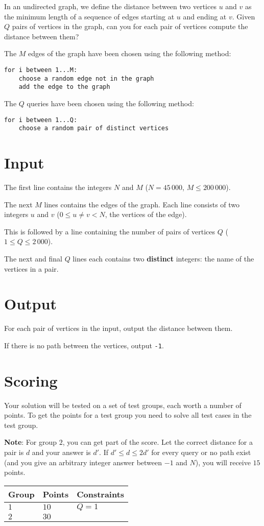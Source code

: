 In an undirected graph, we define the distance between two vertices $u$ and $v$ as the minimum length of a sequence of edges starting at $u$ and ending at $v$.
Given $Q$ pairs of vertices in the graph, can you for each pair of vertices compute the distance between them?

The $M$ edges of the graph have been chosen using the following method:
\begin{verbatim}
for i between 1...M:
    choose a random edge not in the graph
    add the edge to the graph
\end{verbatim}

The $Q$ queries have been chosen using the following method:
\begin{verbatim}
for i between 1...Q:
    choose a random pair of distinct vertices
\end{verbatim}

\section*{Input}
The first line contains the integers $N$ and $M$ ($N = 45\,000$, $M \le 200\,000$). 

The next $M$ lines contains the edges of the graph.
Each line consists of two integers $u$ and $v$ ($0 \le u \neq v < N$, the vertices of the edge).

This is followed by a line containing the number of pairs of vertices $Q$ ($1 \le Q \le 2\,000$).

The next and final $Q$ lines each contains two \textbf{distinct} integers: the name of the vertices in a pair.

\section*{Output}
For each pair of vertices in the input, output the distance between them.

If there is no path between the vertices, output \texttt{-1}.

\section*{Scoring}
Your solution will be tested on a set of test groups, each worth a number of points.
To get the points for a test group you need to solve all test cases in the test group.

\textbf{Note}: For group $2$, you can get part of the score.
Let the correct distance for a pair is $d$ and your answer is $d'$.
If $d' \le d \le 2d'$ for every query or no path exist (and you give an arbitrary integer answer between $-1$ and $N$), you will receive $15$ points. 

\noindent
\begin{tabular}{| l | l | p{10cm} |}
  \hline
  Group & Points & Constraints \\ \hline
  $1$    & $10$        &  $Q = 1$ \\ \hline
  $2$    & $30$       & \\ \hline
\end{tabular}
